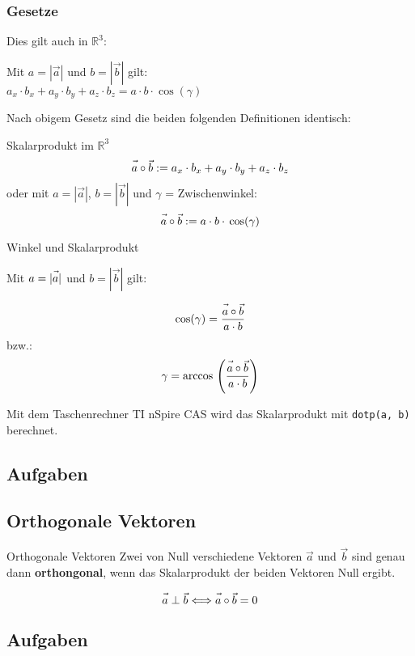 \subsubsection{Gesetze}
Dies gilt auch in $\mathbb{R}^3$:

\begin{gesetz}{}{}
  Mit $a = |\vec{a}|$ und $b = |\vec{b}|$ gilt:\\
  $a_x\cdot{}b_x + a_y\cdot{}b_y  + a_z\cdot{}b_z = a\cdot{}b\cdot{}\cos(\gamma)$
\end{gesetz}
 

Nach obigem Gesetz sind die beiden folgenden Definitionen identisch:
\begin{definition}{Skalarprodukt im $\mathbb{R}^3$}{}
  $$\vec{a\vphantom{b}}\circ\vec{b} := a_x\cdot{}b_x + a_y \cdot{} b_y + a_z\cdot{}b_z$$
oder mit $a=|\vec{a}|$, $b=|\vec{b}|$ und $\gamma$ = Zwischenwinkel:
  $$\vec{a\vphantom{b}}\circ\vec{b} := a\cdot{}b\cdot{}\cos({\gamma})$$
\end{definition}


\begin{gesetz}{Winkel und
    Skalarprodukt}{}


  Mit $a=|\vec{\vphantom{b}a}|$ und $b = |\vec{b}|$ gilt:
  
  $$\cos(\gamma) = \frac{\vec{a\vphantom{b}}\circ\vec{b}}{a\cdot b}$$
  bzw.:
  $$\gamma = \arccos{} \left(\frac{\vec{a\vphantom{b}}\circ\vec{b}}{a\cdot b}\right)$$
  
\end{gesetz}

Mit dem Taschenrechner TI nSpire CAS wird das Skalarprodukt mit
\texttt{dotp(a, b)} berechnet.

\subsection*{Aufgaben}



\newpage

\subsection{Orthogonale Vektoren}

\begin{gesetz}{Orthogonale Vektoren}{}
  Zwei von Null verschiedene Vektoren $\vec{a}$ und $\vec{b}$ sind genau dann
  \textbf{orthongonal}, wenn das Skalarprodukt der beiden Vektoren
  Null ergibt.


  $$\vec{\vphantom{b}a} \perp \vec{b} \Longleftrightarrow
  \vec{\vphantom{b}a}\circ{}\vec{b} = 0$$
\end{gesetz}


\subsection*{Aufgaben}
